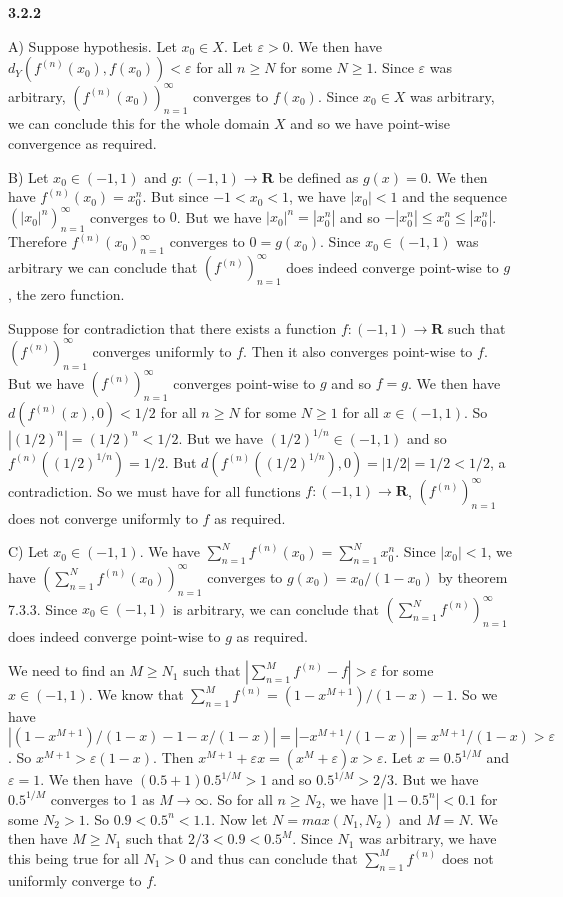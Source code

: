\documentclass[12pt]{article}
\begin{document}
\textbf{3.2.2}

A) Suppose hypothesis. Let $x_0\in X$. Let $\varepsilon>0 $. We then have $d_Y(f^{(n)}(x_0), f(x_0)) < \varepsilon$ for all $n\geq N$ for some $N\geq 1$. Since $\varepsilon$ was arbitrary, $(f^{(n)}(x_0))_{n=1}^\infty$ converges to $f(x_0)$. Since $x_0\in X$ was arbitrary, we can conclude this for the whole domain $X$ and so we have point-wise convergence as required.

B) Let $x_0\in (-1,1)$ and $g: (-1,1) \to \textbf{R}$ be defined as $g(x) = 0$. We then have $f^{(n)}(x_0) = x_0^{n}$. But since $-1<x_0 < 1$, we have $|x_0| < 1$ and the sequence $ (|x_0|^n)_{n=1}^\infty$ converges to $0$. But we have $|x_0|^n = |x_0^n|$ and so $-|x_0^n|\leq x_0^n\leq |x_0^n|$. Therefore $f^{(n)}(x_0)_{n=1}^\infty$ converges to $0 = g(x_0)$. Since $x_0\in (-1,1)$ was arbitrary we can conclude that $(f^{(n)})^\infty_{n=1}$ does indeed converge point-wise to $g$, the zero function.

Suppose for contradiction that there exists a function $f: (-1,1) \to \textbf{R}$ such that $(f^{(n)})^\infty_{n=1}$ converges uniformly to $f$. Then it also converges point-wise to $f$. But we have $(f^{(n)})^\infty_{n=1}$ converges point-wise to $g$ and so $f=g$. We then have $d(f^{(n)}(x), 0) < 1/2$ for all $n\geq N$ for some $N\geq 1$ for all $x\in (-1,1)$. So $|(1/2)^n| = (1/2)^n < 1/2$. But we have $ (1/2)^{1/n} \in (-1,1)$ and so $f^{(n)}((1/2)^{1/n}) = 1/2$. But $d(f^{(n)}((1/2)^{1/n}), 0 )= |1/2| = 1/2 < 1/2$, a contradiction. So we must have for all functions $f: (-1,1) \to \textbf{R}$, $(f^{(n)})^\infty_{n=1}$ does not converge uniformly to $f$ as required.

C)
Let $x_0\in (-1,1)$. We have $\sum_{n=1}^Nf^{(n)}(x_0) =\sum_{n=1}^Nx_0^{n}$. Since $|x_0| < 1$, we have $(\sum_{n=1}^Nf^{(n)}(x_0))_{n=1}^\infty$ converges to $g(x_0) = x_0/(1-x_0)$ by theorem 7.3.3. Since $x_0\in (-1,1)$ is arbitrary, we can conclude that $(\sum_{n=1}^Nf^{(n)})_{n=1}^\infty$ does indeed converge point-wise to $g$ as required.

We need to find an $M\geq N_1$ such that $|\sum^{M}_{n=1}f^{(n)}- f|>\varepsilon$ for some $x\in (-1,1)$. We know that $\sum^{M}_{n=1}f^{(n)} = (1-x^{M+1})/(1-x) -1$. So we have $|(1-x^{M+1})/(1-x) -1 - x/(1-x)|    = | -x^{M+1}/(1-x)| =x^{M+1}/(1-x) > \varepsilon$. So $x^{M+1} > \varepsilon(1-x)$. Then $x^{M+1}+\varepsilon x =(x^{M}+\varepsilon )x> \varepsilon$. Let $x=0.5^{1/M}$ and $\varepsilon = 1$. We then have $(0.5+1 )0.5^{1/M}> 1$ and so $0.5^{1/M}> 2/3$. But we have $0.5^{1/M}$ converges to 1 as $M\to \infty$. So for all $n\geq N_2$, we have $ |1-0.5^{n}| < 0.1$ for some $N_2> 1$. So $0.9<0.5^n < 1.1$. Now let $N = max(N_1,N_2)$ and $M = N$. We then have $M\geq N_1$ such that $2/3 <0.9<0.5^M $. Since $N_1$ was arbitrary, we have this being true for all $N_1>0$ and thus can conclude that $\sum^{M}_{n=1}f^{(n)}$ does not uniformly converge to $f$.
\end{document}
